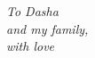 
\setcounter{page}{2}

\begin{flushright}
	\emph{To Dasha \\and my family, \\with love} \\
\end{flushright}
